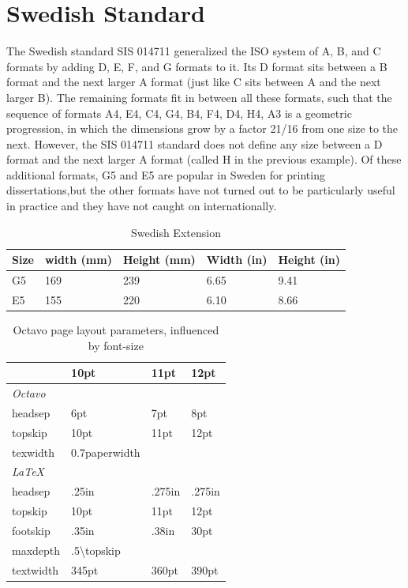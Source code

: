 \clearpage

\section{Swedish Standard}
The Swedish standard SIS 014711 generalized the ISO system of A, B, and C formats by adding D, E, F, and G formats to it. Its D format sits between a B format and the next larger A format (just like C sits between A and the next larger B). The remaining formats fit in between all these formats, such that the sequence of formats A4, E4, C4, G4, B4, F4, D4, H4, A3 is a geometric progression, in which the dimensions grow by a factor 21/16 from one size to the next. However, the SIS 014711 standard does not define any size between a D format and the next larger A format (called H in the previous example). Of these additional formats, G5 and E5 are popular in Sweden for printing dissertations,but the other formats have not turned out to be particularly useful in practice and they have not caught on internationally.

\begin{table}[ht]
\caption{Swedish Extension}
\begin{tabular}{lllll}
\toprule
Size &width (mm)  &Height (mm)  &Width (in) &Height (in)\\
\midrule
G5 &169 &239 &6.65 &9.41\\
E5  &155 &220 &6.10 &8.66\\

\bottomrule
\end{tabular}
\end{table}


\begin{table}
\centering
\caption{Octavo page layout parameters, influenced by font-size}
\begin{tabular}{llll}
\toprule
                    & 10pt & 11pt &12pt \\
\midrule
\textit{Octavo}              &      &      &\\
headsep        &  6pt  &  7pt &  8pt\\
topskip          & 10pt &  11pt & 12pt\\
texwidth         &0.7paperwidth & &\\
\midrule
\textit{LaTeX}              &      &      &\\
headsep        & .25in   &  .275in & .275in \\
topskip          & 10pt &  11pt & 12pt\\
footskip         &.35in &  .38in & 30pt \\
maxdepth         &.5\textbackslash topskip & &\\
textwidth        & 345pt  & 360pt & 390pt\\
\bottomrule
\end{tabular}
\end{table}

